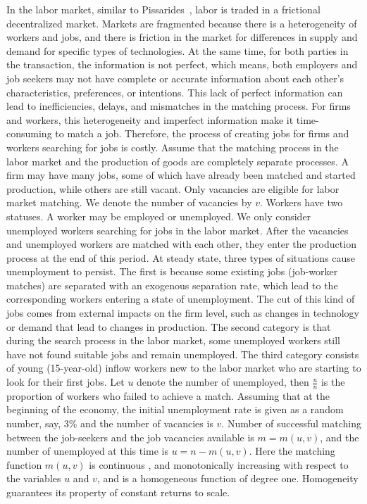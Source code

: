 \documentclass[ %
    final,
    scrbook,
    listoffigures,
    listoftables, 
    glossary]{cu-thesis}
\begin{document}
In the labor market, similar to Pissarides~\cite{pissarides2000equilibrium}, labor is traded in a frictional decentralized market. Markets are fragmented because there is a heterogeneity of workers and jobs, and there is friction in the market for differences in supply and demand for specific types of technologies. At the same time, for both parties in the transaction, the information is not perfect, which means, both employers and job seekers may
not have complete or accurate information about each other’s characteristics, preferences, or intentions. This lack of perfect information can lead to inefficiencies, delays, and mismatches in the matching process. For firms and workers, this heterogeneity and imperfect information make it time-consuming to match a job. Therefore, the process of creating jobs for firms and workers searching for jobs is costly. Assume that the matching process in the labor market and the production of goods are completely separate processes. A firm may have many jobs, some of which have already been matched and started production, while others are still vacant. Only vacancies are eligible for labor market matching. We denote the number of vacancies by $v$. Workers have two statuses. A worker may be employed or unemployed. We only consider unemployed workers searching for jobs in the labor market. After the vacancies and unemployed workers are matched with each other, they enter the production process at the end of this period. At steady state, three types of situations cause unemployment to persist. The first is because some existing jobs (job-worker matches) are separated with an exogenous separation rate, which lead to the corresponding workers entering a state of unemployment. The cut of this kind of jobs comes from external impacts on the firm level, such as changes in technology or demand that lead to changes in production. The second category is that during the search process in the labor market, some unemployed workers still have not found suitable jobs and remain unemployed. The third category consists of young (15-year-old) inflow workers new to the labor market who are starting to look for their first jobs. Let $u$ denote the number of unemployed, then $\frac{u}{n}$ is the proportion of workers who failed to achieve a match. Assuming that at the beginning of the economy, the initial unemployment rate is given as a random number, say, 3\% and the number of vacancies is $v$. Number of successful matching between the job-seekers and the job vacancies available is $m=m(u,v)$, and the number of unemployed at this time is $u=n-m(u,v)$. Here the matching function $m(u,v)$ is continuous , and monotonically increasing with respect to the variables $u$ and $v$, and is a homogeneous function of degree one. Homogeneity guarantees its property of constant returns to scale. 
\end{document}
